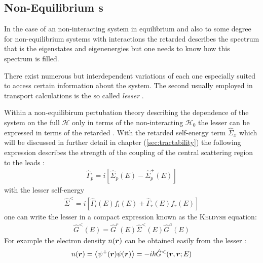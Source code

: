 \subsection{Non-Equilibrium \cgfnc s}
In the case of an non-interacting system in equilibrium and also to some degree for non-equilibrium systems with interactions the retarded \gfnc{} describes the spectrum that is the eigenstates and eigenenergies but one needs to know how this spectrum is filled.\par 
There exist numerous but interdependent variations of \gfnc{} each one especially suited to access certain information about the system.
The second \gfnc{} usually employed in transport calculations is the so called \emph{lesser \gfnc{}} \cite{haug2008quantum}.\par
Within a non-equilibirum pertubation theory describing the dependence of the system on the full \hamil{} $\mathcal{H}$ only in terms of the non-interacting \hamil{} $\mathcal{H}_0$\cite{Jauho2006} the lesser \gfnc{} can be expressed in terms of the retarded \gfnc{}. With the retarded self-energy term $\hat{\Sigma}_x$ which will be discussed in further detail in chapter (\ref{sec:tractability}) the following expression describes the strength of the coupling of the central scattering region to the leads \cite{Datta1997}:
\begin{align}
\hat{\Gamma}_p = i\left[\hat{\Sigma}_p(E)-\hat{\Sigma}_p^+(E)\right]
\end{align}
with the lesser self-energy
\begin{align}
\hat{\Sigma}^<=i\left[\hat{\Gamma}_l(E)f_l(E)+\hat{\Gamma}_r(E)f_r(E) \right]
\end{align}
one can write the lesser \gfnc{} in a compact expression known as the \textsc{Keldysh} equation:
\begin{align}
\hat{G}^<(E) = \hat{G}^r(E) \hat{\Sigma}^<(E) \hat{G}^a(E)
\label{eqn:keldyshequation}
\end{align}
For example the electron density  $n(\boldsymbol{r})$ can be obtained easily from the lesser \gfnc{}:
\begin{align}
	n(\boldsymbol{r}) = \left< \psi^+ (\boldsymbol{r}) \psi(\boldsymbol{r})\right> = -i\hbar \hat{G}^<(\boldsymbol{r},\boldsymbol{r};E)
	\label{eqn:edensfromgreensfnc}
\end{align}

